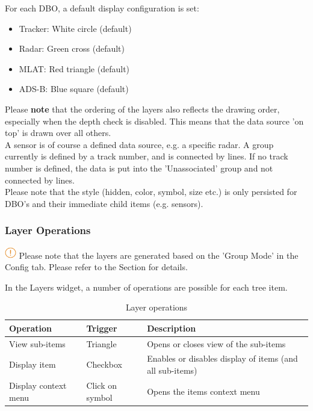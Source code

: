 {For each DBO, a default display configuration is set:

\begin{itemize}
 \item Tracker: White circle (default)
 \item Radar: Green cross (default)
 \item MLAT: Red triangle (default)
 \item ADS-B: Blue square (default)
\end{itemize}

Please \textbf{note} that the ordering of the layers also reflects the drawing order, especially when the depth check is disabled. This means that the data source 'on top' is drawn over all others. \\

A sensor is of course a defined data source, e.g. a specific radar. A group currently is defined by a track number, and is connected by lines. If no track number is defined, the data is put into the 'Unassociated' group and not connected by lines. \\

Please note that the style (hidden, color, symbol, size etc.) is only persisted for DBO's and their immediate child items (e.g. sensors). 

\subsubsection{Layer Operations}

\includegraphics[width=0.5cm]{../../data/icons/hint.png} Please note that the layers are generated based on the 'Group Mode' in the Config tab. Please refer to the Section  for details.

In the Layers widget, a number of operations are possible for each tree item.

\begin{table}[H]
  \center
  \begin{tabular}{ | l | l | l |}
    \hline
    \textbf{Operation} & \textbf{Trigger} &  \textbf{Description} \\ \hline
    View sub-items & Triangle & Opens or closes view of the sub-items \\ \hline
    Display item & Checkbox & Enables or disables display of items (and all sub-items) \\ \hline
    Display context menu & Click on symbol & Opens the items context menu \\ \hline
  \end{tabular}
  \caption{Layer operations}
\end{table}

}
